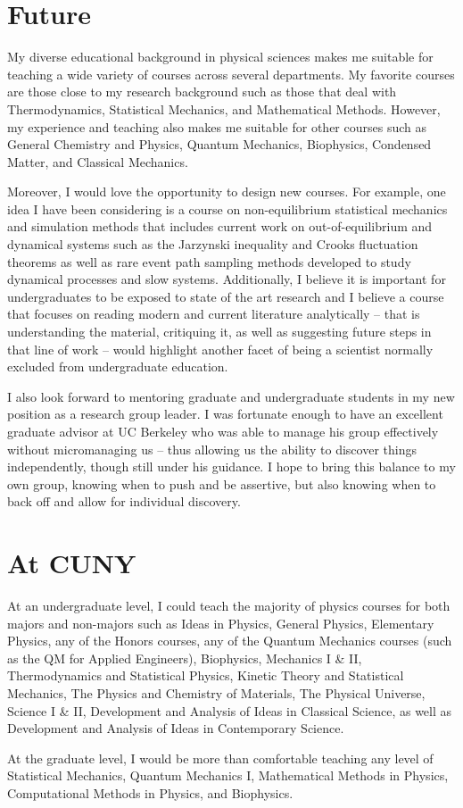 \documentclass[11pt]{article}
\begin{document}
\section{Future} %

My diverse educational background in physical sciences makes me suitable for teaching a wide variety of courses across several departments.  My favorite courses are those close to my research background such as those that deal with Thermodynamics, Statistical Mechanics, and Mathematical Methods.  However, my experience and teaching also makes me suitable for other courses such as General Chemistry and Physics, Quantum Mechanics, Biophysics, Condensed Matter, and Classical Mechanics.

Moreover, I would love the opportunity to design new courses.  For example, one idea I have been considering is a course on non-equilibrium statistical mechanics and simulation methods that includes current work on out-of-equilibrium and dynamical systems such as the Jarzynski inequality and Crooks fluctuation theorems as well as rare event path sampling methods developed to study dynamical processes and slow systems.  Additionally, I believe it is important for undergraduates to be exposed to state of the art research and I believe a course that focuses on reading modern and current literature analytically -- that is understanding the material, critiquing it, as well as suggesting future steps in that line of work -- would highlight another facet of being a scientist normally excluded from undergraduate education.

I also look forward to mentoring graduate and undergraduate students in my new position as a research group leader.  I was fortunate enough to have an excellent graduate advisor at UC Berkeley who was able to manage his group effectively without micromanaging us -- thus allowing us the ability to discover things independently, though still under his guidance.  I hope to bring this balance to my own group, knowing when to push and be assertive, but also knowing when to back off and allow for individual discovery.

\section{At CUNY} %

At an undergraduate level, I could teach the majority of physics courses for both majors and non-majors such as Ideas in Physics, General Physics, Elementary Physics, any of the Honors courses, any of the Quantum Mechanics courses (such as the QM for Applied Engineers), Biophysics, Mechanics I \& II, Thermodynamics and Statistical Physics, Kinetic Theory and Statistical Mechanics, The Physics and Chemistry of Materials, The Physical Universe, Science I \& II, Development and Analysis of Ideas in Classical Science, as well as Development and Analysis of Ideas in Contemporary Science.

At the graduate level, I would be more than comfortable teaching any level of Statistical Mechanics, Quantum Mechanics I, Mathematical Methods in Physics, Computational Methods in Physics, and Biophysics.
\end{document}
